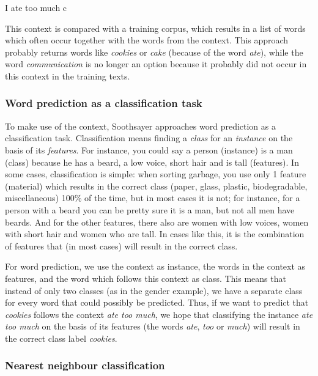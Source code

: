 \documentclass[12pt]{article}
\begin{document}
\begin{examples}
\item I ate too much c \label{only_c_r}
\end{examples}

This context is compared with a training corpus, which results in a list of words which often occur together with the words from the context. This approach probably returns words like \emph{cookies} or \emph{cake} (because of the word \emph{ate}), while the word \emph{communication} is no longer an option because it probably did not occur in this context in the training texts.

\subsubsection{Word prediction as a classification task}

To make use of the context, Soothsayer approaches word prediction as a classification task. Classification means finding a \emph{class} for an \emph{instance} on the basis of its \emph{features}. For instance, you could say a person (instance) is a man (class) because he has a beard, a low voice, short hair and is tall (features). In some cases, classification is simple: when sorting garbage, you use only 1 feature (material) which results in the correct class (paper, glass, plastic, biodegradable, miscellaneous) 100\% of the time, but in most cases it is not; for instance, for a person with a beard you can be pretty sure it is a man, but not all men have beards. And for the other features, there also are women with low voices, women with short hair and women who are tall. In cases like this, it is the combination of features that (in most cases) will result in the correct class.

For word prediction, we use the context as instance, the words in the context as features, and the word which follows this context as class. This means that instead of only two classes (as in the gender example), we have a separate class for every word that could possibly be predicted. Thus, if we want to predict that \emph{cookies} follows the context \emph{ate too much}, we hope that classifying the instance \emph{ate too much} on the basis of its features (the words \emph{ate}, \emph{too} or \emph{much}) will result in the correct class label \emph{cookies}.

\subsubsection{Nearest neighbour classification}
\end{document}
